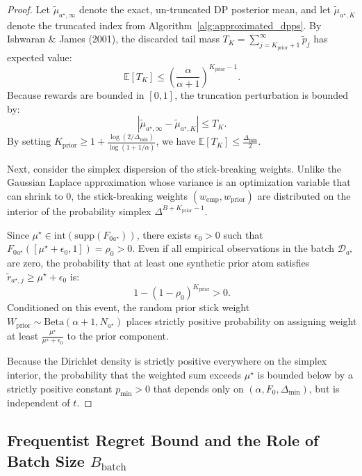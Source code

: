 \documentclass[twoside]{article}
\begin{document}
\begin{proof}
Let $\tilde{\mu}_{a^\star, \infty}$ denote the exact, un-truncated DP posterior mean, and let $\tilde{\mu}_{a^\star, K}$ denote the truncated index from Algorithm~\ref{alg:approximated_dpps}.
By Ishwaran \& James (2001), the discarded tail mass $T_K = \sum_{j=K_{\text{prior}}+1}^\infty \tilde{p}_j$ has expected value:
\begin{equation}
\mathbb{E}[T_K] \le \left(\frac{\alpha}{\alpha + 1}\right)^{K_{\text{prior}}-1}.
\end{equation}
Because rewards are bounded in $[0, 1]$, the truncation perturbation is bounded by:
\begin{equation}
|\tilde{\mu}_{a^\star, \infty} - \tilde{\mu}_{a^\star, K}| \le T_K.
\end{equation}
By setting $K_{\text{prior}} \ge 1 + \frac{\log(2 / \Delta_{\min})}{\log(1 + 1/\alpha)}$, we have $\mathbb{E}[T_K] \le \frac{\Delta_{\min}}{2}$.

Next, consider the simplex dispersion of the stick-breaking weights. Unlike the Gaussian Laplace approximation whose variance is an optimization variable that can shrink to 0, the stick-breaking weights $(w_{\text{emp}}, w_{\text{prior}})$ are distributed on the interior of the probability simplex $\Delta^{B + K_{\text{prior}}-1}$.

Since $\mu^\star \in \text{int}(\text{supp}(F_{0a^\star}))$, there exists $\epsilon_0 > 0$ such that $F_{0a^\star}([\mu^\star + \epsilon_0, 1]) = \rho_0 > 0$. Even if all empirical observations in the batch $\mathcal{D}_{a^\star}$ are zero, the probability that at least one synthetic prior atom satisfies $\tilde{r}_{a^\star, j} \ge \mu^\star + \epsilon_0$ is:
\begin{equation}
1 - (1 - \rho_0)^{K_{\text{prior}}} > 0.
\end{equation}
Conditioned on this event, the random prior stick weight $W_{\text{prior}} \sim \text{Beta}(\alpha + 1, N_{a^\star})$ places strictly positive probability on assigning weight at least $\frac{\mu^\star}{\mu^\star + \epsilon_0}$ to the prior component. 

Because the Dirichlet density is strictly positive everywhere on the simplex interior, the probability that the weighted sum exceeds $\mu^\star$ is bounded below by a strictly positive constant $p_{\min} > 0$ that depends only on $(\alpha, F_0, \Delta_{\min})$, but is independent of $t$.
\end{proof}

\subsection{Frequentist Regret Bound and the Role of Batch Size $B_{\text{batch}}$}
\end{document}
